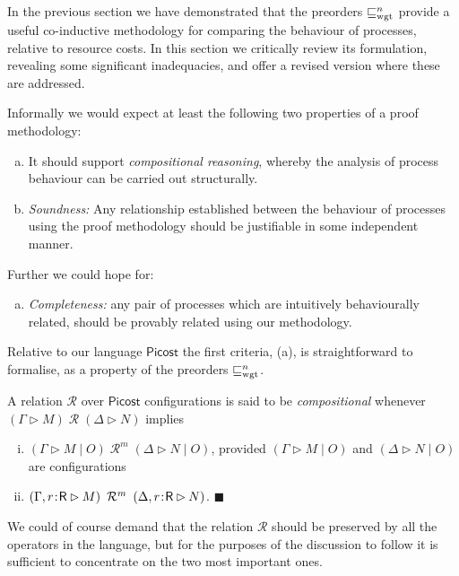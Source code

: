 \documentclass{LMCS}
\newcommand{\pfn}[1]{\mathsf{#1}}  \newcommand{\cfn}[1]{\mathsf{#1}}  \newcommand{\ownfnt}[1]{{\mathsf{#1}}}
\newcommand{\picost}{\ensuremath{\pfn{Picost}}\xspace}
\newcommand{\with}{\mathbin \rhd}
\newcommand{\amort}[1]{\mathrel{\sqsubseteq_{\rm wgt}^{#1}}}
\newcommand{\typeletter}[1]{{\mathsf{#1}}}
\newcommand{\tR}{\typeletter{R}}
\newcommand{\calR}{\mathbin{\mathcal{R}}}
\newcommand{\Cassoc}[2]{ {{#1}\kern -0.2em : \kern -0.2em {#2}}}
\newcommand{\Cpar}{\mathbin{|}}
\newcommand{\EndDefBox}{\null\hfill$\blacksquare$}
\newcommand{\boxHere}{\global\let\EndProof\empty\EndDefBox}
\begin{document}
In the previous section we have demonstrated that the preorders
$\amort{n}$ provide a useful co-inductive methodology for comparing the
behaviour of processes, relative to resource costs.  In this section
we critically review its formulation, revealing some significant
inadequacies, and offer a revised version where these are addressed.

Informally we would expect at least the following two properties of
a proof methodology:
\begin{enumerate}[(a)]
\item 
It should support \emph{compositional reasoning}, whereby 
the analysis of process behaviour can be carried out structurally.

\item
\emph{Soundness:}
Any relationship established between the behaviour of processes using the proof methodology should be
justifiable in some independent manner.
\end{enumerate}
Further we could hope for:
\begin{enumerate}[(c)]
\item 
\emph{Completeness:} 
any pair of processes which are intuitively behaviourally related, should be provably related
using our methodology. 
\end{enumerate}

Relative to our language \picost the first criteria, (a), is straightforward 
to formalise, as a property of the preorders $\amort{n}$.

\begin{defi}[Compositional]\label{def:comp}
  A relation $\calR$ over \picost configurations is said to be 
\emph{compositional} whenever
$(\Gamma \with M) \;\calR\; (\Delta \with N)$  implies 
 \begin{enumerate}[(i)]
 \item 

$(\Gamma \with M \Cpar O) \;\calR^m\; (\Delta \with N \Cpar O)$, provided 
$(\Gamma \with M \Cpar O)$ and $(\Delta \with N \Cpar O)$ are configurations

\item $(\Gamma, \Cassoc{r}{\tR} \with M) \;\calR^m\; (\Delta, \Cassoc{r}{\tR}  \with N)$.
\boxHere
\end{enumerate}

\end{defi}
We could of course  demand that  the relation $\calR$ should be preserved by all
the  operators in the language, but for the purposes of the discussion to follow it is
sufficient to concentrate on the two most important ones. 
\end{document}
